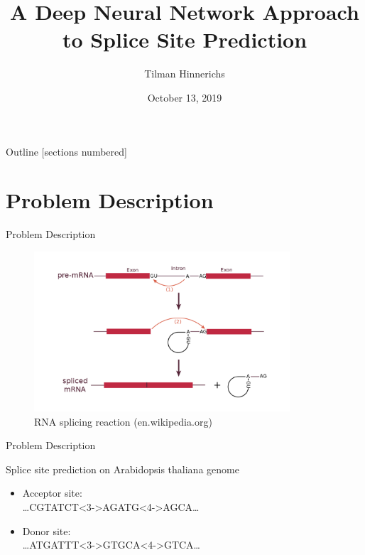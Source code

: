 \documentclass[10pt]{beamer}
\title{A Deep Neural Network Approach to Splice Site Prediction}
\author{Tilman Hinnerichs}
\institute{Knowledge Mining Lab -- KAUST}
\date{October 13, 2019}
\begin{document}
	
\begin{frame}
	\titlepage
\end{frame}

\begin{frame}{Outline}
	[sections numbered]
	\tableofcontents
\end{frame}

\section{Problem Description}
\begin{frame}{Problem Description}
	\begin{figure}[ht]
		\centering
		\includegraphics[width = 0.85\textwidth]{RNA_splicing_reaction.png}
		\caption{RNA splicing reaction (en.wikipedia.org)}
	\end{figure}
\end{frame}

\begin{frame}{Problem Description}
	
	\large Splice site prediction on Arabidopsis thaliana genome
	\vspace{0.5cm}
	\pause
	\begin{exampleblock}{}
		\begin{itemize}
			\item Acceptor site:\\
			\dots CGTATCT<3->{AG}ATG<4->{AG}CA\dots
			\item Donor site:\\
			\dots ATGATTT<3->{GT}GCA<4->{GT}CA\dots
			
		\end{itemize}
	\end{exampleblock}
	
\end{frame}
\end{document}
